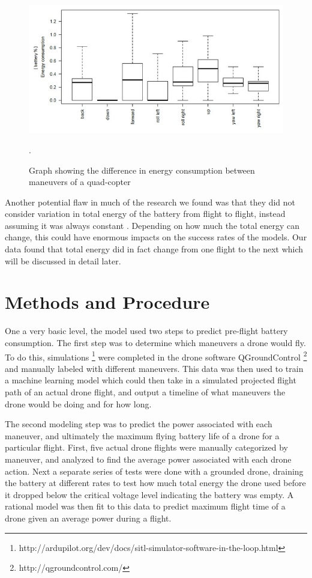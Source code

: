 \documentclass{article}
\begin{document}
\begin{figure}[!h]
	\centering
	\includegraphics[scale=0.38]{images/source2graph.jpg}
	\caption{Graph showing the difference in energy consumption between maneuvers of a quad-copter \protect\cite{Corral}}.
	\label{fig:source2}
\end{figure}

Another potential flaw in much of the research we found was that they did not consider variation in total energy of the battery from flight to flight, instead assuming it was always constant \cite{Prasetia} \cite{Chen}. Depending on how much the total energy can change, this could have enormous impacts on the success rates of the models. Our data found that total energy did in fact change from one flight to the next which will be discussed in detail later.




\section{Methods and Procedure}
One a very basic level, the model used two steps to predict pre-flight battery consumption. The first step was to determine which maneuvers a drone would fly. To do this, simulations \footnote{http://ardupilot.org/dev/docs/sitl-simulator-software-in-the-loop.html} were completed in the drone software QGroundControl \footnote{http://qgroundcontrol.com/} and manually labeled with different maneuvers. This data was then used to train a machine learning model which could then take in a simulated projected flight path of an actual drone flight, and output a timeline of what maneuvers the drone would be doing and for how long.\par

The second modeling step was to predict the power associated with each maneuver, and ultimately the maximum flying battery life of a drone for a particular flight. First, five actual drone flights were manually categorized by maneuver, and analyzed to find the average power associated with each drone action. Next a separate series of tests were done with a grounded drone, draining the battery at different rates to test how much total energy the drone used before it dropped below the critical voltage level indicating the battery was empty. A rational model was then fit to this data to predict maximum flight time of a drone given an average power during a flight.\par
\end{document}
